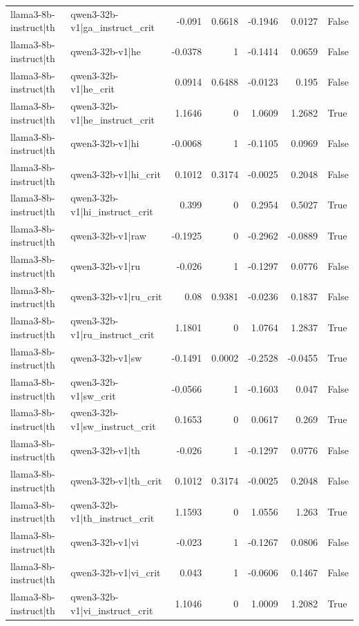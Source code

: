 \begin{table}
\begin{tabular}{l l r r r r l}
llama3-8b-instruct|th & qwen3-32b-v1|ga_instruct_crit & -0.091 & 0.6618 & -0.1946 & 0.0127 & False \\
llama3-8b-instruct|th & qwen3-32b-v1|he & -0.0378 & 1 & -0.1414 & 0.0659 & False \\
llama3-8b-instruct|th & qwen3-32b-v1|he_crit & 0.0914 & 0.6488 & -0.0123 & 0.195 & False \\
llama3-8b-instruct|th & qwen3-32b-v1|he_instruct_crit & 1.1646 & 0 & 1.0609 & 1.2682 & True \\
llama3-8b-instruct|th & qwen3-32b-v1|hi & -0.0068 & 1 & -0.1105 & 0.0969 & False \\
llama3-8b-instruct|th & qwen3-32b-v1|hi_crit & 0.1012 & 0.3174 & -0.0025 & 0.2048 & False \\
llama3-8b-instruct|th & qwen3-32b-v1|hi_instruct_crit & 0.399 & 0 & 0.2954 & 0.5027 & True \\
llama3-8b-instruct|th & qwen3-32b-v1|raw & -0.1925 & 0 & -0.2962 & -0.0889 & True \\
llama3-8b-instruct|th & qwen3-32b-v1|ru & -0.026 & 1 & -0.1297 & 0.0776 & False \\
llama3-8b-instruct|th & qwen3-32b-v1|ru_crit & 0.08 & 0.9381 & -0.0236 & 0.1837 & False \\
llama3-8b-instruct|th & qwen3-32b-v1|ru_instruct_crit & 1.1801 & 0 & 1.0764 & 1.2837 & True \\
llama3-8b-instruct|th & qwen3-32b-v1|sw & -0.1491 & 0.0002 & -0.2528 & -0.0455 & True \\
llama3-8b-instruct|th & qwen3-32b-v1|sw_crit & -0.0566 & 1 & -0.1603 & 0.047 & False \\
llama3-8b-instruct|th & qwen3-32b-v1|sw_instruct_crit & 0.1653 & 0 & 0.0617 & 0.269 & True \\
llama3-8b-instruct|th & qwen3-32b-v1|th & -0.026 & 1 & -0.1297 & 0.0776 & False \\
llama3-8b-instruct|th & qwen3-32b-v1|th_crit & 0.1012 & 0.3174 & -0.0025 & 0.2048 & False \\
llama3-8b-instruct|th & qwen3-32b-v1|th_instruct_crit & 1.1593 & 0 & 1.0556 & 1.263 & True \\
llama3-8b-instruct|th & qwen3-32b-v1|vi & -0.023 & 1 & -0.1267 & 0.0806 & False \\
llama3-8b-instruct|th & qwen3-32b-v1|vi_crit & 0.043 & 1 & -0.0606 & 0.1467 & False \\
llama3-8b-instruct|th & qwen3-32b-v1|vi_instruct_crit & 1.1046 & 0 & 1.0009 & 1.2082 & True \\

\end{tabular}
\end{table}
